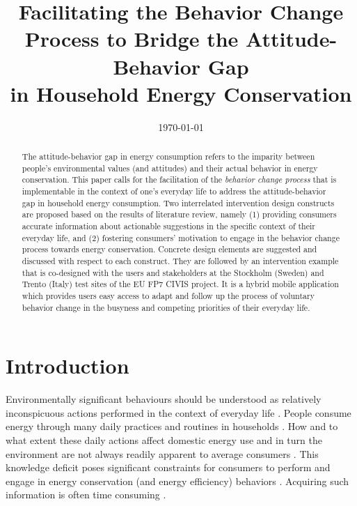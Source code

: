 \documentclass[a4paper]{article}
\title{
\large{Facilitating the Behavior Change Process to Bridge the Attitude-Behavior Gap \\ in Household Energy Conservation}
}
\date{\today}
\begin{document}
\maketitle

\begin{abstract}
The attitude-behavior gap in energy consumption refers to the imparity between people's environmental values (and attitudes) and their actual behavior in energy conservation. This paper calls for the facilitation of the \textit{behavior change process} that is implementable in the context of one's everyday life to address the attitude-behavior gap in household energy consumption. Two interrelated intervention design constructs are proposed based on the results of literature review, namely (1) providing consumers accurate information about actionable suggestions in the specific context of their everyday life, and (2) fostering consumers' motivation to engage in the behavior change process towards energy conservation. Concrete design elements are suggested and discussed with respect to each construct. They are followed by an intervention example that is co-designed with the users and stakeholders at the Stockholm (Sweden) and Trento (Italy) test sites of the EU FP7 CIVIS project. It is a hybrid mobile application which provides users easy access to adapt and follow up the process of voluntary behavior change in the busyness and competing priorities of their everyday life. 
\end{abstract}

\section{Introduction}
\label{sec:intro}

Environmentally significant behaviours should be understood as relatively inconspicuous actions performed in the context of everyday life \citep{Burgess2008}. People consume energy through many daily practices and routines in households \citep{Burgess2008,Hargreaves2010, Fehrenbacher2011,Burchell2014}. How and to what extent these daily actions affect domestic energy use and in turn the environment are not always readily apparent to average consumers \citep{Burgess2008,Delmas2013}. This knowledge deficit poses significant constraints for consumers to perform and engage in energy conservation (and energy efficiency) behaviors \citep{Schultz2002,Burchell2014}. Acquiring such information is often time consuming \citep{Delmas2013}. 
\end{document}
